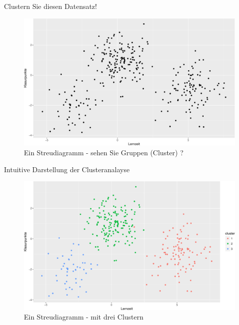 \begin{frame}{Clustern Sie diesen Datensatz!}

\begin{figure}

{\centering \includegraphics[width=0.8\linewidth]{PraDa_Folien_nm_2_files/figure-beamer/cluster1-1} 

}

\caption{Ein Streudiagramm - sehen Sie Gruppen (Cluster) ?}\label{fig:cluster1}
\end{figure}

\end{frame}

\begin{frame}{Intuitive Darstellung der Clusteranalayse}

\begin{figure}

{\centering \includegraphics[width=0.8\linewidth]{PraDa_Folien_nm_2_files/figure-beamer/cluster2-1} 

}

\caption{Ein Streudiagramm - mit drei Clustern}\label{fig:cluster2}
\end{figure}

\end{frame}

